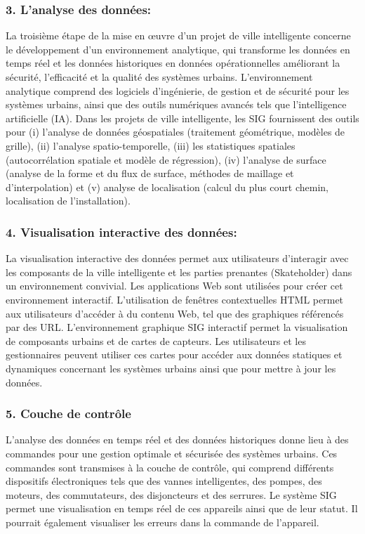 \documentclass[french, a4paper, 12pt]{report}
\begin{document}
\subsubsection{3. L'analyse des données:}
La troisième étape de la mise en œuvre d'un projet de ville intelligente concerne le développement d'un environnement analytique, qui transforme les données en temps réel et les données historiques en données opérationnelles améliorant la sécurité, l'efficacité et la qualité des systèmes urbains. L'environnement analytique comprend des logiciels d'ingénierie, de gestion et de sécurité pour les systèmes urbains, ainsi que des outils numériques avancés tels que l'intelligence artificielle (IA). Dans les projets de ville intelligente, les SIG fournissent des outils pour (i) l’analyse de données géospatiales (traitement géométrique, modèles de grille), (ii) l’analyse spatio-temporelle, (iii) les statistiques spatiales (autocorrélation spatiale et modèle de régression), (iv) l’analyse de surface (analyse de la forme et du flux de surface, méthodes de maillage et d'interpolation) et (v) analyse de localisation (calcul du plus court chemin, localisation de l'installation).

\subsubsection{4. Visualisation interactive des données:}
La visualisation interactive des données permet aux utilisateurs d’interagir avec les composants de la ville intelligente et les parties prenantes (Skateholder) dans un environnement convivial. Les applications Web sont utilisées pour créer cet environnement interactif. L'utilisation de fenêtres contextuelles HTML permet aux utilisateurs d'accéder à du contenu Web, tel que des graphiques référencés par des URL. L'environnement graphique SIG interactif permet la visualisation de composants urbains et de cartes de capteurs. Les utilisateurs et les gestionnaires peuvent utiliser ces cartes pour accéder aux données statiques et dynamiques concernant les systèmes urbains ainsi que pour mettre à jour les données.

\subsubsection{5. Couche de contrôle}
L'analyse des données en temps réel et des données historiques donne lieu à des commandes pour une gestion optimale et sécurisée des systèmes urbains. Ces commandes sont transmises à la couche de contrôle, qui comprend différents dispositifs électroniques tels que des vannes intelligentes, des pompes, des moteurs, des commutateurs, des disjoncteurs et des serrures. Le système SIG permet une visualisation en temps réel de ces appareils ainsi que de leur statut. Il pourrait également visualiser les erreurs dans la commande de l'appareil.
\end{document}

